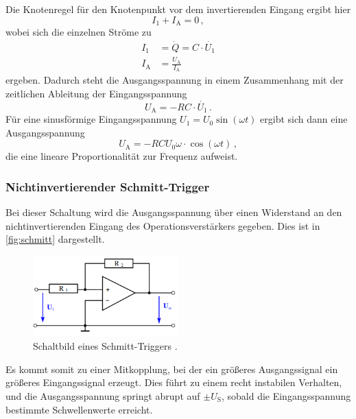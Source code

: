 \noindent
Die Knotenregel für den Knotenpunkt vor dem invertierenden Eingang ergibt hier 
\begin{equation*}
    I_1 + I_\text{A} = 0\, ,
\end{equation*}
wobei sich die einzelnen Ströme zu 
\begin{align*}
    I_1 &= \dot{Q} = C \cdot \dot{U_1} \\
    I_\text{A} &= \frac{U_\text{A}}{I_\text{A}}
\end{align*}
ergeben. Dadurch steht die Ausgangsspannung in einem Zusammenhang mit der zeitlichen Ableitung der Eingangsspannung
\begin{equation*}
    U_\text{A} = - RC \cdot \dot{U_1}\, .
\end{equation*}
Für eine sinusförmige Eingangsspannung $U_1 = U_0 \sin(\omega t)$ ergibt sich dann eine Ausgangsspannung 
\begin{equation}
    U_\text{A} = - R C U_0 \omega \cdot \cos(\omega t)\, ,
    \label{eqn:dif}
\end{equation}
die eine lineare Proportionalität zur Frequenz aufweist.

\subsubsection{Nichtinvertierender Schmitt-Trigger}

\noindent 
Bei dieser Schaltung wird die Ausgangsspannung über einen Widerstand an den nichtinvertierenden Eingang des Operationsverstärkers gegeben. 
Dies ist in \autoref{fig:schmitt} dargestellt.

\begin{figure}
    \centering
    \includegraphics[width=0.5\textwidth]{schmitt.png}
    \caption{Schaltbild eines Schmitt-Triggers \cite{ap51}.}
    \label{fig:schmitt}
\end{figure}
\noindent
Es kommt somit zu einer Mitkopplung, bei der ein größeres Ausgangssignal ein größeres Eingangssignal erzeugt. Dies führt zu einem recht instabilen Verhalten, und die Ausgangsspannung springt abrupt auf $\pm U_\text{S}$, sobald die Eingangsspannung bestimmte Schwellenwerte erreicht.%

